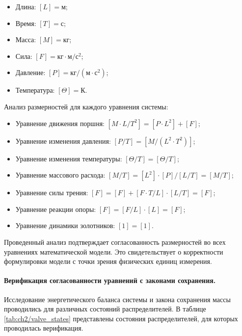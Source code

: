 \begin{itemize}
    \item Длина: $ [L] = \text{м}$;
    \item Время: $ [T] = \text{с}$;
    \item Масса: $ [M] = \text{кг}$;
    \item Сила: $ [F] = \text{кг}\cdot\text{м}/\text{с}^2$;
    \item Давление: $ [P] = \text{кг}/(\text{м}\cdot\text{с}^2)$;
    \item Температура: $ [\Theta] = \text{К}$.
\end{itemize}

Анализ размерностей для каждого уравнения системы:
\begin{itemize}
    \item Уравнение движения поршня: $ [M\cdot L/T^2] = [P\cdot L^2] + [F]$;
    \item Уравнение изменения давления: $ [P/T] = [M/(L^2\cdot T^2)] $;
    \item Уравнение изменения температуры: $ [\Theta/T] = [\Theta/T]$;
    \item Уравнение массового расхода: $  [M/T] = [L^2] \cdot [P] / [L/T] = [M/T] $;
    \item Уравнение силы трения: $  [F] = [F] + [F\cdot T/L] \cdot [L/T] = [F] $;
    \item Уравнение реакции опоры: $  [F] = [F/L] \cdot [L] = [F] $;
    \item Уравнение динамики золотников: $  [1] = [1]$.
\end{itemize}


Проведенный анализ подтверждает согласованность размерностей во всех уравнениях математической модели.
Это свидетельствует о корректности формулировки модели с точки зрения физических единиц измерения.

\paragraph{Верификация согласованности уравнений с законами сохранения.}
Исследование энергетического баланса системы и закона сохранения массы проводились
для различных состояний распределителей. В таблице \ref{tab:ch2/valve_states} представлены состояния распределителей,
для которых проводилась верификация.


